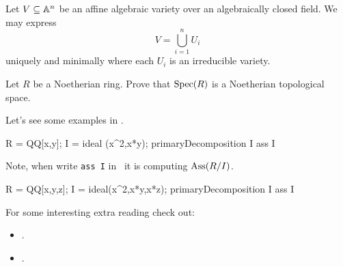\documentclass{ximera}
\begin{document}
\begin{theorem}
  Let $V\subseteq\mathbb A^n$ be an affine algebraic variety over an
  algebraically closed field. We may express
  \[
  V = \bigcup_{i=1}^n U_i
  \]
  uniquely and minimally where each $U_i$ is an irreducible variety.
\end{theorem}


\begin{exercise}
  Let $R$ be a Noetherian ring. Prove that $\operatorname{Spec}(R)$ is a Noetherian topological space. 
\end{exercise}


Let's see some examples in \macaulay.

\begin{macaulay2}
R = QQ[x,y];
I = ideal (x^2,x*y);
primaryDecomposition I
ass I
\end{macaulay2}

Note, when write \texttt{ass I} in \macaulay\, it is computing
$\operatorname{Ass}(R/I)$.

\begin{macaulay2}
R = QQ[x,y,z];
I = ideal(x^2,x*y,x*z);
primaryDecomposition I
ass I
\end{macaulay2}









For some interesting extra reading check out:
\begin{itemize}
\item {}.

\item {}.


\end{itemize}
\end{document}
